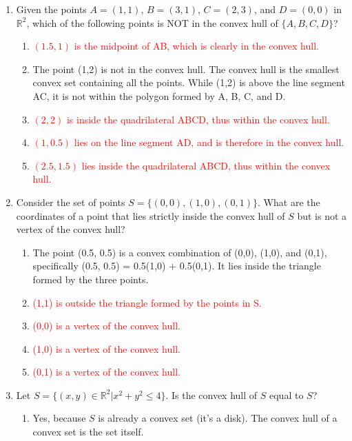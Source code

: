 \documentclass{article}%
\newcommand{\incorrect}[1]{\textcolor{red}{#1}}
\begin{document}
\begin{enumerate}
\begin{enumerate}
\end{enumerate}%
\vspace{1em}%
\item Given the points $A=(1,1)$, $B=(3,1)$, $C=(2,3)$, and $D=(0,0)$ in $\mathbb{R}^2$, which of the following points is NOT in the convex hull of $\{A, B, C, D\}$?%
\begin{enumerate}%
\item \incorrect{$(1.5, 1)$ is the midpoint of AB, which is clearly in the convex hull.}%
\item The point (1,2) is not in the convex hull.  The convex hull is the smallest convex set containing all the points.  While (1,2) is above the line segment AC, it is not within the polygon formed by A, B, C, and D.%
\item \incorrect{$(2, 2)$ is inside the quadrilateral ABCD, thus within the convex hull.}%
\item \incorrect{$(1, 0.5)$ lies on the line segment AD, and is therefore in the convex hull.}%
\item \incorrect{$(2.5, 1.5)$ lies inside the quadrilateral ABCD, thus within the convex hull.}%
\end{enumerate}%
\vspace{1em}%
\item Consider the set of points $S = \{(0,0), (1,0), (0,1)\}$.  What are the coordinates of a point that lies strictly inside the convex hull of $S$ but is not a vertex of the convex hull?%
\begin{enumerate}%
\item The point (0.5, 0.5) is a convex combination of (0,0), (1,0), and (0,1), specifically (0.5, 0.5) = 0.5(1,0) + 0.5(0,1). It lies inside the triangle formed by the three points.%
\item \incorrect{(1,1) is outside the triangle formed by the points in S.}%
\item \incorrect{(0,0) is a vertex of the convex hull.}%
\item \incorrect{(1,0) is a vertex of the convex hull.}%
\item \incorrect{(0,1) is a vertex of the convex hull.}%
\end{enumerate}%
\vspace{1em}%
\item Let $S = \{(x, y) \in \mathbb{R}^2 | x^2 + y^2 \le 4\}$.  Is the convex hull of $S$ equal to $S$?%
\begin{enumerate}%
\item Yes, because $S$ is already a convex set (it's a disk). The convex hull of a convex set is the set itself.%

\end{enumerate}
\end{enumerate}
\end{document}
